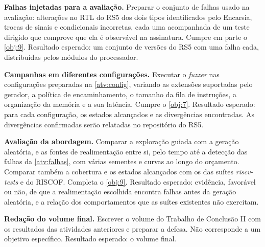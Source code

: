 \begin{atividades}
    \item \label{atv:falhas} \textbf{Falhas injetadas para a avaliação.} Preparar o conjunto de falhas usado na avaliação: alterações no RTL do RS5 dos dois tipos identificados pelo Encarsia, trocas de sinais e condicionais incorretas, cada uma acompanhada de um teste dirigido que comprove que ela é observável na assinatura. Cumpre em parte o \cref{obj:9}. Resultado esperado: um conjunto de versões do RS5 com uma falha cada, distribuídas pelos módulos do processador.

    \item \label{atv:campanhas} \textbf{Campanhas em diferentes configurações.} Executar o \textit{fuzzer} nas configurações preparadas na \cref{atv:config}, variando as extensões suportadas pelo gerador, a política de encaminhamento, o tamanho da fila de instruções, a organização da memória e a sua latência. Cumpre o \cref{obj:7}. Resultado esperado: para cada configuração, os estados alcançados e as divergências encontradas. As divergências confirmadas serão relatadas no repositório do RS5.

    \item \label{atv:avaliacao} \textbf{Avaliação da abordagem.} Comparar a exploração guiada com a geração aleatória, e as fontes de realimentação entre si, pelo tempo até a detecção das falhas da \cref{atv:falhas}, com várias sementes e curvas ao longo do orçamento. Comparar também a cobertura e os estados alcançados com os das suítes \textit{riscv-tests} e do RISCOF. Completa o \cref{obj:9}. Resultado esperado: evidência, favorável ou não, de que a realimentação escolhida encontra falhas antes da geração aleatória, e a relação dos comportamentos que as suítes existentes não exercitam.

    \item \label{atv:redacao} \textbf{Redação do volume final.} Escrever o volume do Trabalho de Conclusão II com os resultados das atividades anteriores e preparar a defesa. Não corresponde a um objetivo específico. Resultado esperado: o volume final.
\end{atividades}
